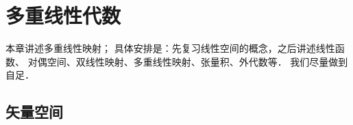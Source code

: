 
\chapter{多重线性代数}\label{chmla} %


本章讲述多重线性映射；
具体安排是：先复习线性空间的概念，之后讲述线性函数、
对偶空间、双线性映射、多重线性映射、张量积、外代数等．
我们尽量做到自足．





\section{矢量空间}\label{chmla:sec_linear-space}

  

